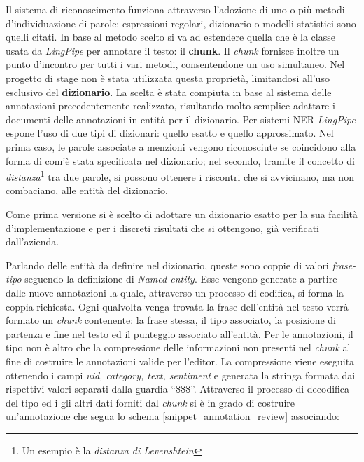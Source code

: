 Il sistema di riconoscimento funziona attraverso l'adozione di uno o più metodi
d'individuazione di parole: espressioni regolari, dizionario o modelli
statistici sono quelli citati. In base al metodo scelto si va ad estendere
quella che è la classe usata da \textit{LingPipe} per annotare il testo: il
\textbf{chunk}. Il \textit{chunk} fornisce inoltre un punto d'incontro per tutti
i vari metodi, consentendone un uso simultaneo. Nel progetto di stage non è
stata utilizzata questa proprietà, limitandosi all'uso esclusivo del
\textbf{dizionario}. La scelta è stata compiuta in base al sistema delle
annotazioni precedentemente realizzato, risultando molto semplice adattare i
documenti delle annotazioni in entità per il dizionario. Per sistemi \gls{NER}
\textit{LingPipe} espone l'uso di due tipi di dizionari: quello esatto e quello
approssimato. Nel prima caso, le parole associate a menzioni vengono
riconosciute se coincidono alla forma di com'è stata specificata nel dizionario;
nel secondo, tramite il concetto di \textit{distanza}\footnote{Un esempio è la
\textit{distanza di Levenshtein}} tra due parole, si possono ottenere i
riscontri che si avvicinano, ma non combaciano, alle entità del dizionario.

Come prima versione si è scelto di adottare un dizionario esatto per la sua
facilità d'implementazione e per i discreti risultati che si ottengono, già
verificati dall'azienda.

Parlando delle entità da definire nel dizionario, queste sono coppie di valori
\textit{frase-tipo} seguendo la definizione di \textit{Named entity}. Esse
vengono generate a partire dalle nuove annotazioni la quale, attraverso un
processo di codifica, si forma la coppia richiesta. Ogni qualvolta venga trovata
la frase dell'entità nel testo verrà formato un \textit{chunk} contenente:
la frase stessa, il tipo associato, la posizione di partenza e fine nel testo ed
il punteggio associato all'entità. Per le annotazioni, il tipo non è altro che
la compressione delle informazioni non presenti nel \textit{chunk} al fine di
costruire le annotazioni valide per l'editor. La compressione viene eseguita
ottenendo i campi \textit{uid, category, text, sentiment} e generata la stringa
formata dai rispettivi valori separati dalla guardia ``\$\$\$''. Attraverso il
processo di decodifica del tipo ed i gli altri dati forniti dal \textit{chunk}
si è in grado di costruire un'annotazione che segua lo schema
\ref{snippet_annotation_review} associando:

